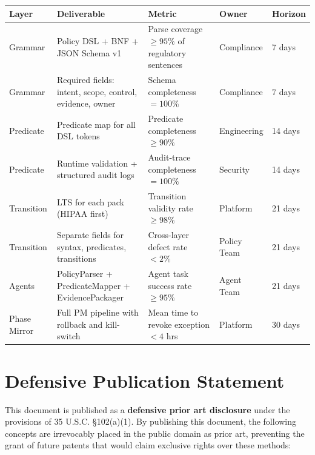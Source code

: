 \documentclass[12pt,letterpaper]{article}
\theoremstyle{definition}
\theoremstyle{plain}
\theoremstyle{remark}
\begin{document}
\begin{center}
\begin{longtable}{p{1.6cm}p{3.2cm}p{4.4cm}p{2.2cm}p{2.2cm}}
\toprule
\textbf{Layer} & \textbf{Deliverable} & \textbf{Metric} & \textbf{Owner} &
\textbf{Horizon} \\
\midrule
\endhead
Grammar &
  Policy DSL + BNF + JSON Schema v1 &
  Parse coverage $\geq 95\%$ of regulatory sentences &
  Compliance &
  7 days \\
\addlinespace
Grammar &
  Required fields: intent, scope, control, evidence, owner &
  Schema completeness $= 100\%$ &
  Compliance &
  7 days \\
\addlinespace
Predicate &
  Predicate map for all DSL tokens &
  Predicate completeness $\geq 90\%$ &
  Engineering &
  14 days \\
\addlinespace
Predicate &
  Runtime validation + structured audit logs &
  Audit-trace completeness $= 100\%$ &
  Security &
  14 days \\
\addlinespace
Transition &
  LTS for each pack (HIPAA first) &
  Transition validity rate $\geq 98\%$ &
  Platform &
  21 days \\
\addlinespace
Transition &
  Separate fields for syntax, predicates, transitions &
  Cross-layer defect rate $< 2\%$ &
  Policy Team &
  21 days \\
\addlinespace
Agents &
  PolicyParser + PredicateMapper + EvidencePackager &
  Agent task success rate $\geq 95\%$ &
  Agent Team &
  21 days \\
\addlinespace
Phase Mirror &
  Full PM pipeline with rollback and kill-switch &
  Mean time to revoke exception $< 4$ hrs &
  Platform &
  30 days \\
\bottomrule
\end{longtable}
\end{center}

\section{Defensive Publication Statement}
\label{sec:defensive}

This document is published as a \textbf{defensive prior art disclosure} under
the provisions of 35 U.S.C. \S 102(a)(1). By publishing this document, the
following concepts are irrevocably placed in the public domain as prior art,
preventing the grant of future patents that would claim exclusive rights over
these methods:
\end{document}
